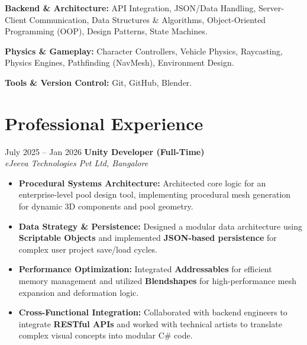 \documentclass[10pt, letterpaper]{article}
\newenvironment{highlights}{
    \begin{itemize}[topsep=0.05cm, parsep=0.05cm, itemsep=0pt, leftmargin=10pt]
}{
    \end{itemize}
}
\begin{document}
\vspace{0.2cm}

\textbf{Backend \& Architecture:}  
API Integration, JSON/Data Handling, Server-Client Communication, Data Structures \& Algorithms, Object-Oriented Programming (OOP), Design Patterns, State Machines.

\vspace{0.2cm}

\textbf{Physics \& Gameplay:}  
Character Controllers, Vehicle Physics, Raycasting, Physics Engines, Pathfinding (NavMesh), Environment Design.

\vspace{0.2cm}

\textbf{Tools \& Version Control:}  
Git, GitHub, Blender.
\section{Professional Experience}

\begin{twocolentry}{
    July 2025 – Jan 2026 
}
    \textbf{Unity Developer (Full-Time)} \\
    \textit{eJeeva Technologies Pvt Ltd, Bangalore} 
\end{twocolentry}
    
\vspace{0.1 cm}
\begin{onecolentry}
    \begin{highlights}
        \item \textbf{Procedural Systems Architecture:} Architected core logic for an enterprise-level pool design tool, implementing procedural mesh generation for dynamic 3D components and pool geometry.
        \item \textbf{Data Strategy \& Persistence:} Designed a modular data architecture using \textbf{Scriptable Objects} and implemented \textbf{JSON-based persistence} for complex user project save/load cycles.
        \item \textbf{Performance Optimization:} Integrated \textbf{Addressables} for efficient memory management and utilized \textbf{Blendshapes} for high-performance mesh expansion and deformation logic.
        \item \textbf{Cross-Functional Integration:} Collaborated with backend engineers to integrate \textbf{RESTful APIs} and worked with technical artists to translate complex visual concepts into modular C\# code.
    \end{highlights}
\end{onecolentry}
\end{document}
